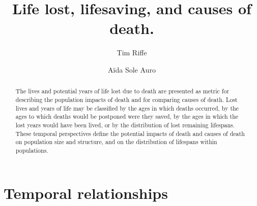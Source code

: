 \documentclass{article}
\begin{document}
\title{Life lost, lifesaving, and causes of death.}

\author[1]{Tim Riffe}
\author[2]{A{\"i}da Sole Auro}
\maketitle

\begin{abstract}
The lives and potential years of life lost due to death are presented as metric
for describing the population impacts of death and for comparing causes of
death. Lost lives and years of life may be classified by the ages in which
deaths occurred, by the ages to which deaths would be postponed were they saved, by the
ages in which the lost years would have been lived, or by the distribution of
lost remaining lifespans. These temporal perspectives define the
potential impacts of death and causes of death on population size and structure,
and on the distribution of lifespans within populations. 
\end{abstract}

\section*{Temporal relationships}
\end{document}
